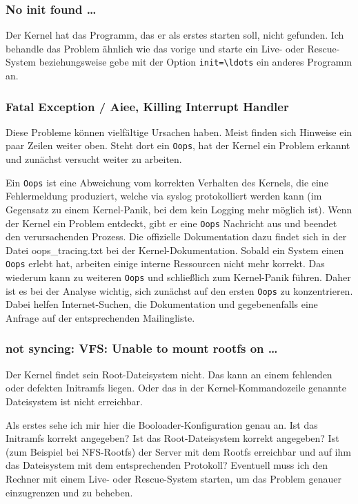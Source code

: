 \subsubsection{No init found \ldots}

Der Kernel hat das Programm, das er als erstes starten soll, nicht gefunden.
Ich behandle das Problem ähnlich wie das vorige und starte ein Live- oder
Rescue-System beziehungsweise gebe mit der Option \verb?init=\ldots? ein
anderes Programm an.

\subsubsection{Fatal Exception / Aiee, Killing Interrupt Handler}

Diese Probleme können vielfältige Ursachen haben. Meist finden sich Hinweise
ein paar Zeilen weiter oben. Steht dort ein \verb?Oops?, hat der Kernel ein
Problem erkannt und zunächst versucht weiter zu arbeiten.

Ein \verb?Oops? ist eine Abweichung vom korrekten Verhalten des Kernels, die
eine Fehlermeldung produziert, welche via syslog protokolliert werden kann (im
Gegensatz zu einem Kernel-Panik, bei dem kein Logging mehr möglich ist). Wenn
der Kernel ein Problem entdeckt, gibt er eine \verb?Oops? Nachricht aus und
beendet den verursachenden Prozess. Die offizielle Dokumentation dazu findet
sich in der Datei oops\_tracing.txt bei der Kernel-Dokumentation. Sobald ein
System einen \verb?Oops? erlebt hat, arbeiten einige interne Ressourcen nicht
mehr korrekt. Das wiederum kann zu weiteren \verb?Oops? und schließlich zum
Kernel-Panik führen. Daher ist es bei der Analyse wichtig, sich zunächst auf
den ersten \verb?Oops? zu konzentrieren. Dabei helfen Internet-Suchen, die
Dokumentation und gegebenenfalls eine Anfrage auf der entsprechenden
Mailingliste.

\subsubsection{not syncing: VFS: Unable to mount rootfs on \ldots}

Der Kernel findet sein Root-Dateisystem nicht. Das kann an einem fehlenden
oder defekten Initramfs liegen. Oder das in der Kernel-Kommandozeile genannte
Dateisystem ist nicht erreichbar.

Als erstes sehe ich mir hier die Booloader-Konfiguration genau an. Ist das
Initramfs korrekt angegeben? Ist das Root-Dateisystem korrekt angegeben? Ist
(zum Beispiel bei NFS-Rootfs) der Server mit dem Rootfs erreichbar und auf ihm
das Dateisystem mit dem entsprechenden Protokoll? Eventuell muss ich den
Rechner mit einem Live- oder Rescue-System starten, um das Problem genauer
einzugrenzen und zu beheben.

